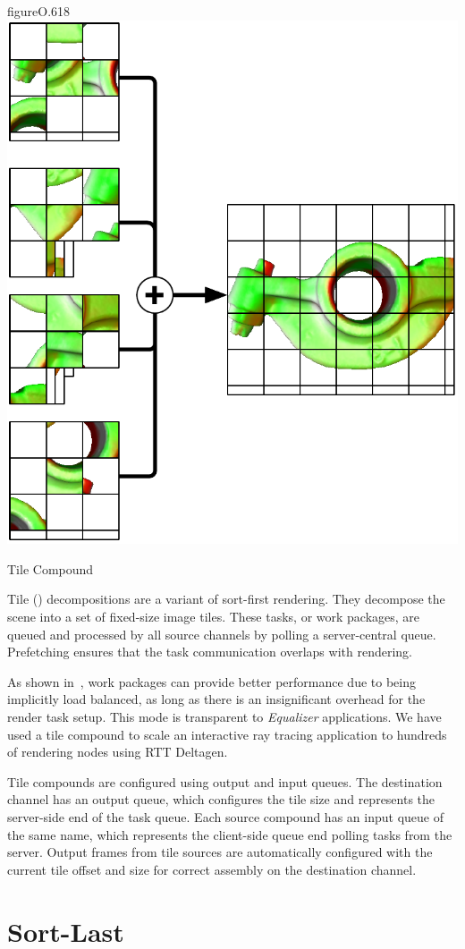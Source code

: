 \begin{wrapfloat}{figure}{O}{.618\textwidth}
 \includegraphics[width=.618\textwidth]{images/tile}
 {\caption{\label{fTile}Tile Compound}}
\end{wrapfloat}

Tile () decompositions are a variant of sort-first rendering. They
decompose the scene into a set of fixed-size image tiles. These tasks, or work
packages, are queued and processed by all source channels by polling a
server-central queue. Prefetching ensures that the task communication overlaps
with rendering.

As shown in~\cite{SPEP:16}, work packages can provide better performance due to
being implicitly load balanced, as long as there is an insignificant overhead
for the render task setup. This mode is transparent to {\em Equalizer}
applications. We have used a tile compound to scale an interactive ray tracing
application to hundreds of rendering nodes using RTT Deltagen.

Tile compounds are configured using output and input queues. The destination
channel has an output queue, which configures the tile size and represents the
server-side end of the task queue. Each source compound has an input queue of
the same name, which represents the client-side queue end polling tasks from
the server. Output frames from tile sources are automatically configured with
the current tile offset and size for correct assembly on the destination
channel.

\section{Sort-Last}

